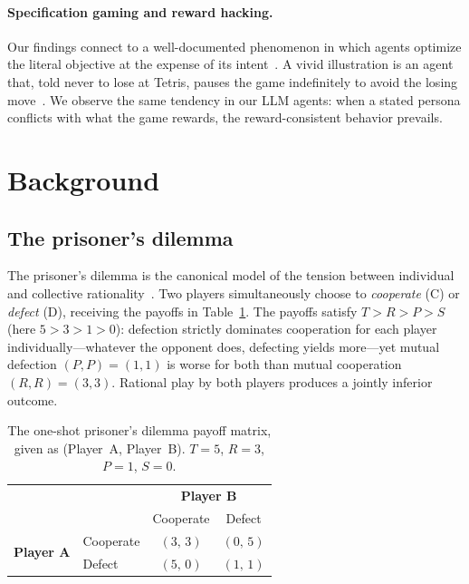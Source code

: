 \paragraph{Specification gaming and reward hacking.}
Our findings connect to a well-documented phenomenon in which agents optimize the literal objective at the expense of its intent~\cite{amodei2016concrete, krakovna2020specification, lehman2020surprising}. A vivid illustration is an agent that, told never to lose at Tetris, pauses the game indefinitely to avoid the losing move~\cite{murphy2013mario}. We observe the same tendency in our LLM agents: when a stated persona conflicts with what the game rewards, the reward-consistent behavior prevails.

\section{Background}
\label{sec:background}

\subsection{The prisoner's dilemma}
The prisoner's dilemma is the canonical model of the tension between individual and collective rationality~\cite{rapoport1965prisoner}. Two players simultaneously choose to \emph{cooperate} (C) or \emph{defect} (D), receiving the payoffs in Table~\ref{tab:pd}. The payoffs satisfy $T > R > P > S$ (here $5 > 3 > 1 > 0$): defection strictly dominates cooperation for each player individually---whatever the opponent does, defecting yields more---yet mutual defection $(P,P)=(1,1)$ is worse for both than mutual cooperation $(R,R)=(3,3)$. Rational play by both players produces a jointly inferior outcome.

\begin{table}[t]
  \caption{The one-shot prisoner's dilemma payoff matrix, given as (Player~A, Player~B). $T{=}5$, $R{=}3$, $P{=}1$, $S{=}0$.}
  \label{tab:pd}
  \begin{tabular}{@{}ll cc@{}}
    \toprule
    & & \multicolumn{2}{c}{\textbf{Player B}} \\
    & & Cooperate & Defect \\
    \midrule
    \multirow{2}{*}{\textbf{Player A}} & Cooperate & $(3,\,3)$ & $(0,\,5)$ \\
                                       & Defect    & $(5,\,0)$ & $(1,\,1)$ \\
    \bottomrule
  \end{tabular}
\end{table}

